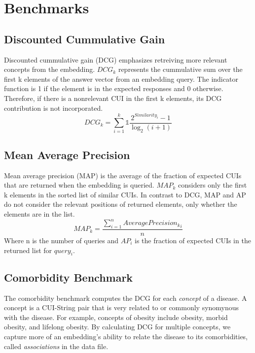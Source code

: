 \documentclass{ws-procs11x85}
\begin{document}
\section{Benchmarks}



\subsection{Discounted Cummulative Gain}

Discounted cummulative gain (DCG) emphasizes retreiving more relevant concepts from the embedding. $DCG_k$ represents the cummulative sum over the first k elements of the answer vector from an embedding query. The indicator function is 1 if the element is in the expected responses and 0 otherwise. Therefore, if there is a nonrelevant CUI in the first k elements, its DCG contribution is not incorporated. 
\begin{equation}
DCG_k = \sum_{i=1}^{k} \mathds{1}\frac{2^{{Similarity}_i} -1}{\log_2 (i+1)}
\end{equation}

\subsection{Mean Average Precision}

Mean average precision (MAP) is the average of the fraction of expected CUIs that are returned when the embedding is queried. $MAP_k$ considers only the first k elements in the sorted list of similar CUIs. In contrast to DCG, MAP and AP do not consider the relevant positions of returned elements, only whether the elements are in the list. 
\begin{equation}
{MAP}_k = \frac{\sum_{i=1}^{n}{Average Precision_k}_i}{n}
\end{equation}
Where n is the number of queries and $AP_i$ is the fraction of expected CUIs in the returned list for $query_i$.

\subsection{Comorbidity Benchmark}

The comorbidity benchmark computes the DCG for each \textit{concept} of a disease. A concept is a CUI-String pair that is very related to or commonly synomynous with the disease. For example, concepts of obesity include obesity, morbid obesity, and lifelong obesity. By calculating DCG for multiple concepts, we capture more of an embedding's ability to relate the disease to its comorbidities, called \textit{associations} in the data file. 
\end{document}
